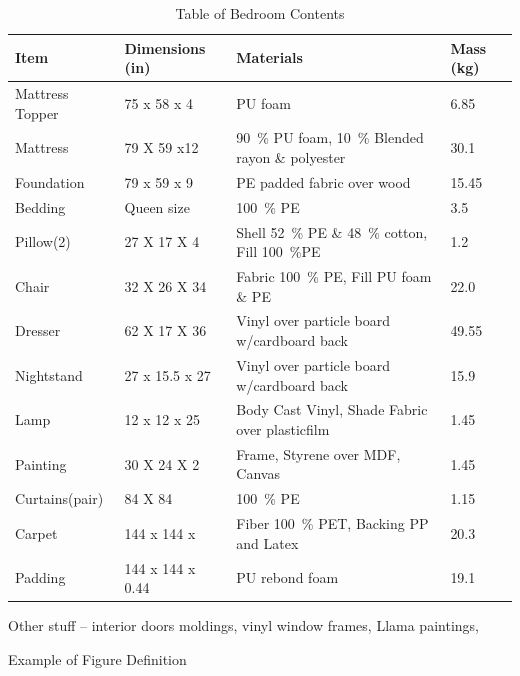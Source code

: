 \documentclass[12pt,oneside]{book}
\begin{document}
\begin{table}[!ht]
	\centering
	\caption{Table of Bedroom Contents}
	\label{tab:BRFuel}
	\begin{tabular}{llll}
		\toprule[1.5pt]
		Item 				& Dimensions (in) 	& Materials 										& Mass (kg)  \\
		\midrule
		Mattress Topper  	& 75 x 58 x 4  		& PU foam  											&  6.85     \\
		Mattress     		& 79 X 59 x12  		& 90~\% PU foam, 10~\% Blended rayon \& polyester   & 30.1  \\
		Foundation   		& 79 x 59 x 9  		& PE padded fabric over wood  						& 15.45     \\
		Bedding      		& Queen size 		& 100~\% PE     									&   3.5     \\	
		Pillow(2)	 		& 27 X 17 X 4 		& Shell 52~\% PE \& 48~\% cotton, Fill 100~\%PE 	& 1.2   \\	
		Chair				& 32 X 26 X 34		& Fabric 100~\% PE, Fill PU foam \& PE  			& 22.0  \\
		Dresser				& 62 X 17 X 36  	& Vinyl over particle board w/cardboard back		& 49.55  \\
		Nightstand			& 27 x 15.5 x 27	& Vinyl over particle board w/cardboard back		& 15.9  \\
		Lamp 				& 12 x 12 x 25		& Body Cast Vinyl, Shade Fabric over plasticfilm	& 1.45  \\
		Painting			& 30 X 24 X 2		& Frame, Styrene over MDF, Canvas					& 1.45  \\
		Curtains(pair) 		& 84 X 84 			& 100~\% PE 										& 1.15  \\
		Carpet				& 144 x 144 x 		& Fiber 100~\% PET, Backing PP and Latex			& 20.3 \\
		Padding				& 144 x 144 x 0.44	& PU rebond foam									& 19.1	\\
		\bottomrule[1.25pt]
	\end{tabular}
\end{table}



Other stuff -- interior doors moldings,  vinyl window frames, Llama paintings, 








Example of Figure Definition

\end{document}
